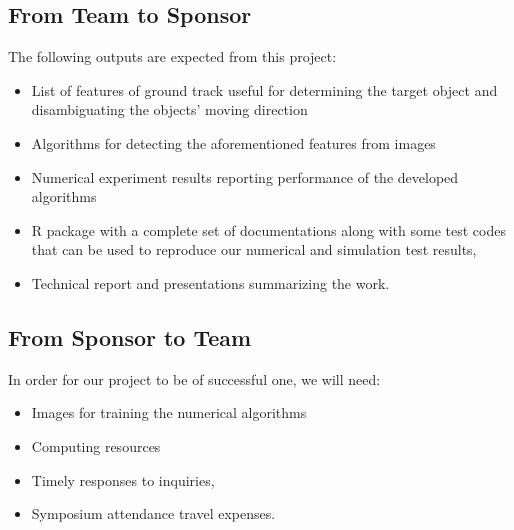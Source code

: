 \documentclass[12pt,letterpaper]{article}
\theoremstyle{definition}
\begin{document}
\subsection{From Team to Sponsor} %
The following outputs are expected from this project:
\begin{itemize}
    \item List of features of ground track useful for determining the
        target object and disambiguating the objects' moving direction 
    \item Algorithms for detecting the aforementioned features from images
    \item Numerical experiment results reporting performance of the developed algorithms
    \item R package with a complete set of documentations along with some test 
        codes that can be used to reproduce our numerical and simulation test
        results,
    \item Technical report and presentations summarizing the work. 
\end{itemize}

\subsection{From Sponsor to Team} %

In order for our project to be of successful one, we will need:
\begin{itemize}
    \item Images for training the numerical algorithms
    \item Computing resources
    \item Timely responses to inquiries, 
    \item Symposium attendance travel expenses.
\end{itemize}


%
%
\end{document}
